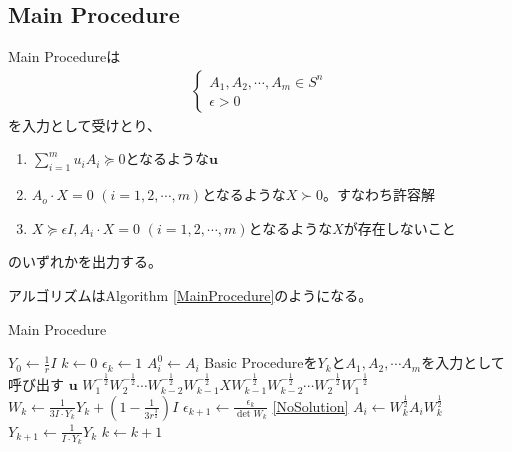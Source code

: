 \subsection{Main Procedure}
Main Procedureは
\begin{align*}
  \left\{
    \begin{array}{l}
      A_1, A_2, \cdots, A_m \in S^n \\
      \epsilon > 0
    \end{array}
  \right.
\end{align*}
を入力として受けとり、
\begin{enumerate}[label=(\alph*)]
  \item $\displaystyle{\sum_{i = 1}^m u_i A_i \succeq 0}$となるような$\mathbf{u}$ \label{DualSolution}
  \item $A_o \cdot X = 0 \,\, (i = 1, 2, \cdots, m)$となるような$X \succ 0$。すなわち許容解 \label{FeasibleSolution}
  \item $X \succeq \epsilon I, A_i \cdot X = 0 \,\, (i = 1, 2, \cdots, m)$となるような$X$が存在しないこと \label{NoSolution}
\end{enumerate}
のいずれかを出力する。

アルゴリズムはAlgorithm \ref{MainProcedure}のようになる。
\begin{algorithm}
  \caption{Main Procedure}
  \label{MainProcedure}
  \begin{algorithmic}[1]
    \State $\displaystyle{Y_0 \leftarrow \frac{1}{r} I}$
    \State $k \leftarrow 0$
    \State $\epsilon_k \leftarrow 1$
      \State $A_i^0 \leftarrow A_i$
    \EndFor
    \State Basic Procedureを$Y_k$と$A_1, A_2, \cdots A_m$を入力として呼び出す \label{CallBasicProcedure}
      \State \Return $\mathbf{u}$
      \State \Return $\displaystyle{W_1^{-\frac{1}{2}} W_2^{-\frac{1}{2}} \cdots W_{k - 2}^{-\frac{1}{2}} W_{k - 1}^{-\frac{1}{2}} X W_{k - 1}^{-\frac{1}{2}} W_{k - 2}^{-\frac{1}{2}} \cdots W_2^{-\frac{1}{2}} W_1^{-\frac{1}{2}}}$
    \EndIf
    \State $\displaystyle{W_k \leftarrow \frac{1}{3 I \cdot Y_k} Y_k + (1 - \frac{1}{3 r^\frac{3}{2}}) I}$
    \State $\displaystyle{\epsilon_{k + 1} \leftarrow \frac{\epsilon_k}{\det W_k}}$
      \State \Return \ref{NoSolution}
    \EndIf
      \State $\displaystyle{A_i \leftarrow W_k^\frac{1}{2} A_i W_k^\frac{1}{2}}$
    \EndFor
    \State $\displaystyle{Y_{k + 1} \leftarrow \frac{1}{I \cdot Y_k} Y_k}$
    \State $k \leftarrow k + 1$
    \State {}
  \end{algorithmic}
\end{algorithm}
